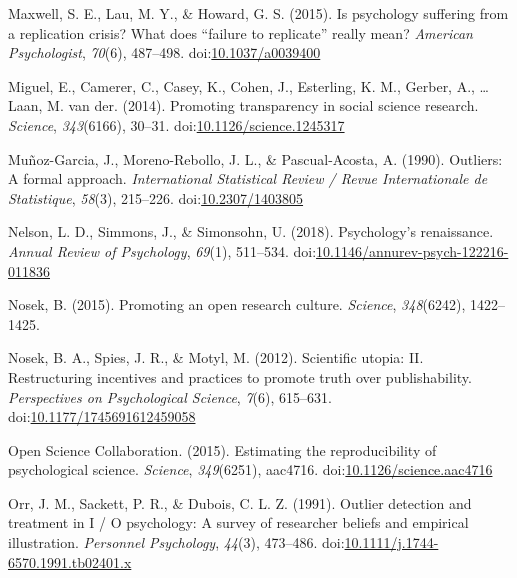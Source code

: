 \documentclass[english,,man]{apa6}
\begin{document}
\leavevmode\hypertarget{ref-Maxwell2015}{}%
Maxwell, S. E., Lau, M. Y., \& Howard, G. S. (2015). Is psychology suffering from a replication crisis? What does ``failure to replicate'' really mean? \emph{American Psychologist}, \emph{70}(6), 487--498. doi:\href{https://doi.org/10.1037/a0039400}{10.1037/a0039400}

\leavevmode\hypertarget{ref-Miguel2014}{}%
Miguel, E., Camerer, C., Casey, K., Cohen, J., Esterling, K. M., Gerber, A., \ldots{} Laan, M. van der. (2014). Promoting transparency in social science research. \emph{Science}, \emph{343}(6166), 30--31. doi:\href{https://doi.org/10.1126/science.1245317}{10.1126/science.1245317}

\leavevmode\hypertarget{ref-Munoz-Garcia1990}{}%
Muñoz-Garcia, J., Moreno-Rebollo, J. L., \& Pascual-Acosta, A. (1990). Outliers: A formal approach. \emph{International Statistical Review / Revue Internationale de Statistique}, \emph{58}(3), 215--226. doi:\href{https://doi.org/10.2307/1403805}{10.2307/1403805}

\leavevmode\hypertarget{ref-Nelson2018}{}%
Nelson, L. D., Simmons, J., \& Simonsohn, U. (2018). Psychology's renaissance. \emph{Annual Review of Psychology}, \emph{69}(1), 511--534. doi:\href{https://doi.org/10.1146/annurev-psych-122216-011836}{10.1146/annurev-psych-122216-011836}

\leavevmode\hypertarget{ref-Nosek2015b}{}%
Nosek, B. (2015). Promoting an open research culture. \emph{Science}, \emph{348}(6242), 1422--1425.

\leavevmode\hypertarget{ref-Nosek2012c}{}%
Nosek, B. A., Spies, J. R., \& Motyl, M. (2012). Scientific utopia: II. Restructuring incentives and practices to promote truth over publishability. \emph{Perspectives on Psychological Science}, \emph{7}(6), 615--631. doi:\href{https://doi.org/10.1177/1745691612459058}{10.1177/1745691612459058}

\leavevmode\hypertarget{ref-ScienceCollaboration2015}{}%
Open Science Collaboration. (2015). Estimating the reproducibility of psychological science. \emph{Science}, \emph{349}(6251), aac4716. doi:\href{https://doi.org/10.1126/science.aac4716}{10.1126/science.aac4716}

\leavevmode\hypertarget{ref-Orr1991}{}%
Orr, J. M., Sackett, P. R., \& Dubois, C. L. Z. (1991). Outlier detection and treatment in I / O psychology: A survey of researcher beliefs and empirical illustration. \emph{Personnel Psychology}, \emph{44}(3), 473--486. doi:\href{https://doi.org/10.1111/j.1744-6570.1991.tb02401.x}{10.1111/j.1744-6570.1991.tb02401.x}
\end{document}
